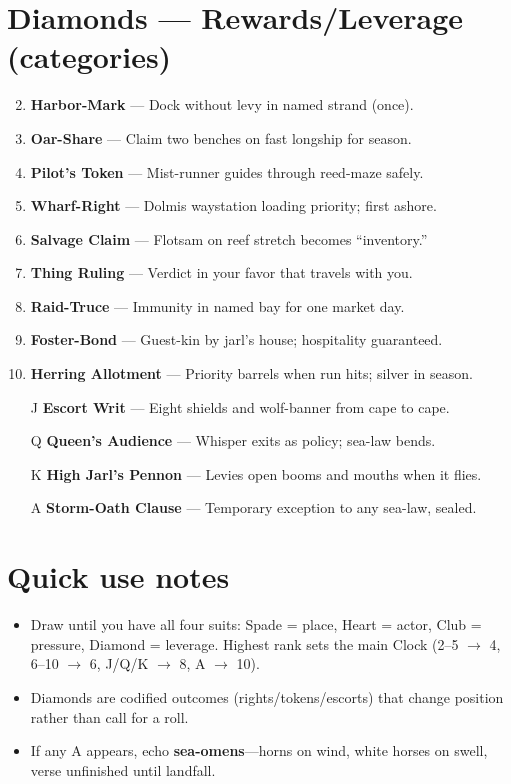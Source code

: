 \section*{Diamonds --- Rewards/Leverage (categories)}
\label{sec:linn-rewards}
\begin{enumerate}
\setcounter{enumi}{1}
\item \textbf{Harbor-Mark} --- Dock without levy in named strand (once).
\item \textbf{Oar-Share} --- Claim two benches on fast longship for season.
\item \textbf{Pilot's Token} --- Mist-runner guides through reed-maze safely.
\item \textbf{Wharf-Right} --- Dolmis waystation loading priority; first ashore.
\item \textbf{Salvage Claim} --- Flotsam on reef stretch becomes ``inventory.''
\item \textbf{Thing Ruling} --- Verdict in your favor that travels with you.
\item \textbf{Raid-Truce} --- Immunity in named bay for one market day.
\item \textbf{Foster-Bond} --- Guest-kin by jarl's house; hospitality guaranteed.
\item \textbf{Herring Allotment} --- Priority barrels when run hits; silver in season.
\item[J] \textbf{Escort Writ} --- Eight shields and wolf-banner from cape to cape.
\item[Q] \textbf{Queen's Audience} --- Whisper exits as policy; sea-law bends.
\item[K] \textbf{High Jarl's Pennon} --- Levies open booms and mouths when it flies.
\item[A] \textbf{Storm-Oath Clause} --- Temporary exception to any sea-law, sealed.
\end{enumerate}

\section*{Quick use notes}
\label{sec:linn-quick-use}
\begin{itemize}
\item Draw until you have all four suits: Spade = place, Heart = actor, Club = pressure, Diamond = leverage. Highest rank sets the main Clock (2--5 $\rightarrow$ 4, 6--10 $\rightarrow$ 6, J/Q/K $\rightarrow$ 8, A $\rightarrow$ 10).
\item Diamonds are codified outcomes (rights/tokens/escorts) that change position rather than call for a roll.
\item If any A appears, echo \textbf{sea-omens}---horns on wind, white horses on swell, verse unfinished until landfall.
\end{itemize}

